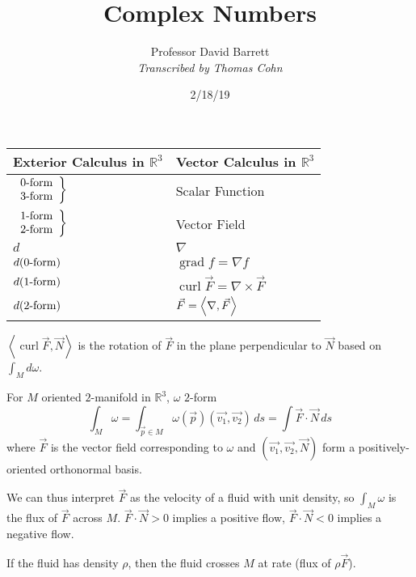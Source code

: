 \documentclass[10pt,letterpaper]{article}
\author{Professor David Barrett\\ \small\textit{Transcribed by Thomas Cohn}}
\title{Complex Numbers}
\date{2/18/19} %
\newcommand{\n}{\hfill\break}
\newcommand{\ptxt}[1]{\textrm{\textnormal{#1}}}
\newcommand{\reals}{\mathbb{R}}
\newcommand{\R}{\reals}
\newcommand{\iprod}[1]{\left<#1\right>}
\newcommand{\del}{\nabla}
\DeclareMathOperator{\grad}{grad}
\DeclareMathOperator{\curl}{curl}
\let\div\relax
\DeclareMathOperator{\div}{div}
\begin{document}
\maketitle
\setlength\RaggedRightParindent{\parindent}
\RaggedRight

\begin{center}
\begin{tabular}{l|l}
	Exterior Calculus in $\R^{3}$ & Vector Calculus in $\R^{3}$\\ \hline
	$\left.\begin{array}{r}0\ptxt{-form}\\ 3\ptxt{-form}\end{array}\right\}$ & Scalar Function\\
	$\left.\begin{array}{r}1\ptxt{-form}\\ 2\ptxt{-form}\end{array}\right\}$ & Vector Field\\
	$d$ & $\del$\\
	$d(0\ptxt{-form})$ & $\grad{}f=\del{}f$\\
	$d(1\ptxt{-form})$ & $\curl\vec{F}=\del\times\vec{F}$\\
	$d(2\ptxt{-form})$ & $\div\vec{F}=\iprod{\del,\vec{F}}$
\end{tabular}
\end{center}

\par\noindent $\iprod{\curl\vec{F},\vec{N}}$ is the rotation of $\vec{F}$ in the plane perpendicular to $\vec{N}$ based on $\int_{M}d\omega$.\n

\par\noindent For $M$ oriented $2$-manifold in $\R^{3}$, $\omega$ $2$-form
\[
\int_{M}\omega=\int_{\vec{p}\in{}M}\omega(\vec{p})(\vec{v_{1}},\vec{v_{2}})\,ds=\int\vec{F}\cdot\vec{N}\,ds
\]
where $\vec{F}$ is the vector field corresponding to $\omega$ and $(\vec{v_{1}},\vec{v_{2}},\vec{N})$ form a positively-oriented orthonormal basis.\n

\par\noindent We can thus interpret $\vec{F}$ as the velocity of a fluid with unit density, so $\int_{M}\omega$ is the flux of $\vec{F}$ across $M$. $\vec{F}\cdot\vec{N}>0$ implies a positive flow, $\vec{F}\cdot\vec{N}<0$ implies a negative flow.\n

\par\noindent If the fluid has density $\rho$, then the fluid crosses $M$ at rate (flux of $\rho\vec{F}$).\n
\end{document}
